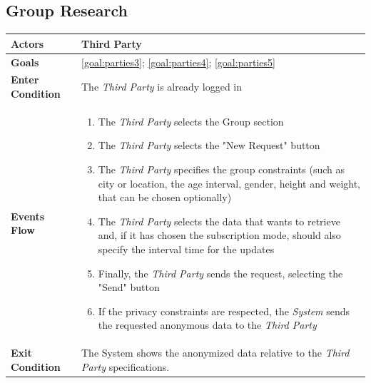  \subsection{Group Research}


\begin{table}[H]
	\centering
    
    \begin{tabular}{|p{3.5cm}|p{10.3cm}|}
    
    \hline
    \textbf{\large{Actors}}  			& \tabitem Third Party 																\\
    \hline
    \textbf{\large{Goals}} 				&
    \ref{goal:parties3};
    \ref{goal:parties4};
    \ref{goal:parties5}
    \\
    
    \hline
    \textbf{\large{Enter Condition}}	& The \emph{Third Party} is already logged in	\\
    
    \hline
    \textbf{\large{Events Flow}}		& \begin{enumerate}[leftmargin=0.5cm]
                                \item The \emph{Third Party} selects the Group section
                                \item The \emph{Third Party} selects the "New Request" button
                                \item The \emph{Third Party} specifies the group constraints (such as city or location, the age interval, gender, height and weight, that can be chosen optionally)
                                 \item The \emph{Third Party} selects the data that wants to retrieve and, if it has chosen the subscription mode, should also specify the interval time for the updates
                                 \item Finally, the \emph{Third Party} sends the request, selecting the "Send" button
                                 \item If the privacy constraints are respected, the \emph{System} sends the requested anonymous data to the \emph{Third Party}
                                           
                                          \end{enumerate}
    										\\
    \hline
    \textbf{\large{Exit Condition}} 	& The System shows the                                     anonymized data relative to the                                    \emph{Third Party} specifications. \\
    

\end{tabular}
\end{table}
